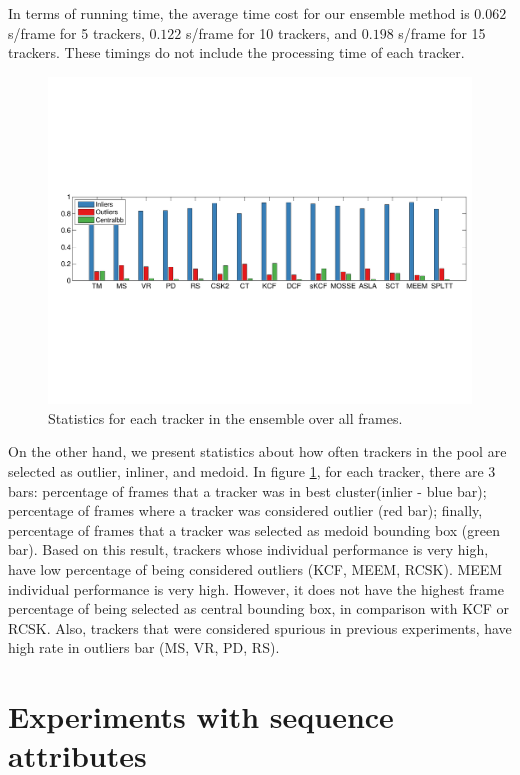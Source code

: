 In terms of running time, the average time cost for our ensemble
method is $0.062$ s/frame for 5
trackers, $0.122$ s/frame for 10 trackers, and $0.198$ s/frame for 15 trackers.
These timings do not include the processing time of each tracker.

\begin{figure}[h!]
\centering
\includegraphics[width=1.0\linewidth, trim= 0.7cm 7.6cm 0.3cm 7.8cm, clip=true]{Figures/stats.pdf}
\caption{\small Statistics for each tracker in the ensemble over all frames. }
\label{fig:stats}
\end{figure}

On the other hand, we present statistics about how often trackers in the pool
are selected as outlier, inliner, and medoid.
In figure
\ref{fig:stats}, for each tracker, there are 3 bars: percentage of frames that a
tracker was in best cluster(inlier - blue bar); percentage of frames where a
tracker was considered outlier (red bar); finally, percentage of frames that a
tracker was selected as medoid bounding box (green bar). Based on this result,
trackers whose individual performance is very high, have low percentage of being
considered outliers (KCF, MEEM, RCSK). MEEM individual performance is very high.
However, it does not have the highest frame percentage of being selected as
central bounding box, in comparison with KCF or RCSK. Also, trackers that were
considered spurious in previous experiments, have high rate in outliers bar
(MS, VR, PD, RS). 

\section{Experiments with sequence attributes}

